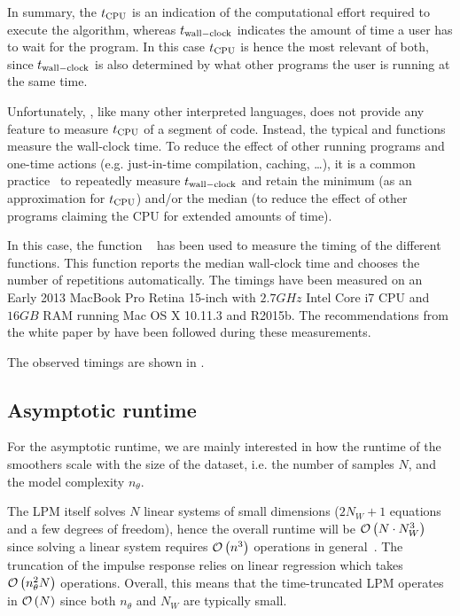 In summary, the $t_{\mathrm{CPU}}$ is an indication of the computational effort required to execute the algorithm, whereas $t_{\mathrm{wall-clock}}$ indicates the amount of time a user has to wait for the program.
In this case $t_{\mathrm{CPU}}$ is hence the most relevant of both, since $t_{\mathrm{wall-clock}}$ is also determined by what other programs the user is running at the same time.

Unfortunately, \MATLAB, like many other interpreted languages, does not provide any feature to measure $t_{\mathrm{CPU}}$ of a segment of code.
Instead, the typical  and  functions measure the wall-clock time.
To reduce the effect of other running programs and one-time actions (e.g. just-in-time compilation, caching, \ldots), it is a common practice~\citep{McKeeman2008} to repeatedly measure $t_{\mathrm{wall-clock}}$ and retain the minimum (as an approximation for $t_{\mathrm{CPU}}$) and/or the median (to reduce the effect of other programs claiming the \gls{CPU} for extended amounts of time).

In this case, the \MATLAB function ~\citep{matlab:timeit} has been used to measure the timing of the different functions.
This function  reports the median wall-clock time and chooses the number of repetitions automatically.
The timings have been measured on an Early 2013 MacBook Pro Retina 15-inch with $2.7\unit{GHz}$ Intel Core i7 \gls{CPU} and $16 \unit{GB}$ \gls{RAM} running Mac OS X 10.11.3 and \MATLAB R2015b.
The recommendations from the white paper by \citet{McKeeman2008} have been followed during these measurements.


The observed timings are shown in .


\subsection{Asymptotic runtime}
For the asymptotic runtime, we are mainly interested in how the runtime of the smoothers scale with the size of the dataset, i.e. the number of samples $N$, and the model complexity $n_{\theta}$.


The \gls{LPM} itself solves $N$ linear systems of small dimensions ($2N_W + 1$ equations and a few degrees of freedom), hence the overall runtime will be $\mathcal{O} \left( N \cdot N_W^3 \right)$ since solving a linear system requires $\mathcal{O} \left( n^3 \right)$ operations in general~\citep{Golub1996}.
The truncation of the impulse response relies on linear regression which takes $\mathcal{O} \left( n_{\theta}^2 N \right)$ operations.
Overall, this means that the time-truncated \gls{LPM} operates in $\mathcal{O} \left( N \right)$ since both $n_{\theta}$ and $N_W$ are typically small.

